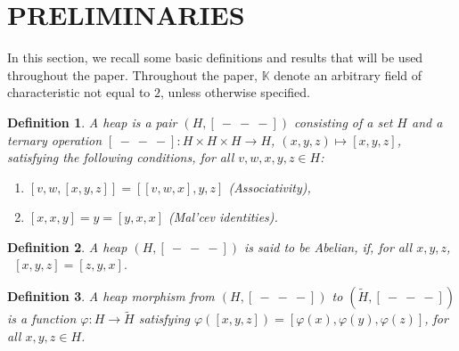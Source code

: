 \documentclass{article}
\newtheorem{definition}{Definition}[section]
\theoremstyle{definition}
\theoremstyle{remark}
\theoremstyle{plain}
\begin{document}
\section{PRELIMINARIES}
In this section, we recall some basic definitions and results that will be used throughout the paper. 
Throughout the paper, $\mathbb{K}$ denote an arbitrary field of characteristic not equal to $2$, unless otherwise specified.
\begin{definition} \cite{Pru1,Brz2019Truss, Brz22}
A \emph{heap} is a pair $(H,[\ -\ -\ -])$ consisting of a set $H$ and a ternary operation $[\ -\ -\ -] : H \times H \times H \to H$, $(x, y, z) \mapsto [x, y, z]$, satisfying the following conditions, for all $v, w, x, y, z \in H$:
\begin{enumerate}
    \item $[v, w, [x, y, z]] = [[v, w, x], y, z] $ (Associativity),
    \item $[x, x, y] = y = [y, x, x]$ (Mal’cev identities).
\end{enumerate}

\end{definition}
\begin{definition}
    A heap $(H, [\ -\ -\ -])$ is said to be \emph{Abelian,} if, for all $x, y, z$, ~$[x, y, z] = [z, y, x].$

\end{definition}
\begin{definition}
    A \emph{heap morphism} from $(H, [\ -\ -\ -])$ to $(\widetilde{H}, [\ -\ -\ -])$ is a function $\varphi : H \to \widetilde{H}$
satisfying $\varphi([x, y, z]) = [\varphi(x), \varphi(y), \varphi(z)]$, for all $x, y, z\in H$.

\end{definition}
\end{document}
